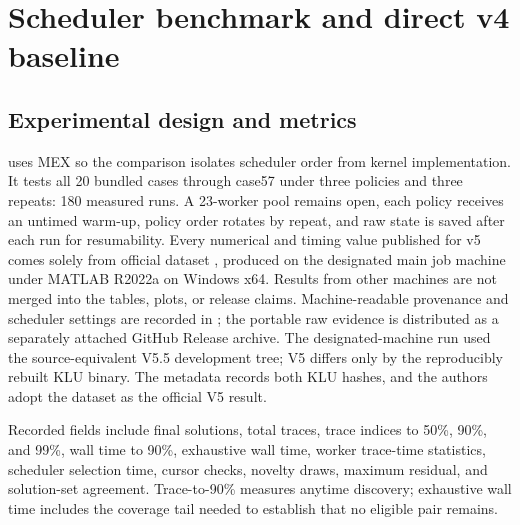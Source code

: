 \section{Scheduler benchmark and direct v4 baseline}\label{sec:benchmark}

\subsection{Experimental design and metrics}
 uses MEX so the comparison isolates
scheduler order from kernel implementation. It tests all 20 bundled cases
through case57 under three policies and three repeats: 180 measured runs.
A 23-worker pool remains open, each policy receives an untimed warm-up, policy
order rotates by repeat, and raw state is saved after each run for resumability.
Every numerical and timing value published for v5 comes solely from official
dataset , produced on the designated main job machine under
MATLAB R2022a on Windows x64. Results from other machines are not merged into
the tables, plots, or release claims. Machine-readable provenance and scheduler
settings are recorded in ; the portable raw
evidence is distributed as a separately attached GitHub Release archive.
The designated-machine run used the source-equivalent V5.5 development tree;
V5 differs only by the reproducibly rebuilt KLU binary. The metadata records
both KLU hashes, and the authors adopt the dataset as the official V5 result.

Recorded fields include final solutions, total traces, trace indices to 50\%,
90\%, and 99\%, wall time to 90\%, exhaustive wall time, worker trace-time
statistics, scheduler selection time, cursor checks, novelty draws, maximum
residual, and solution-set agreement. Trace-to-90\% measures anytime discovery;
exhaustive wall time includes the coverage tail needed to establish that no
eligible pair remains.

